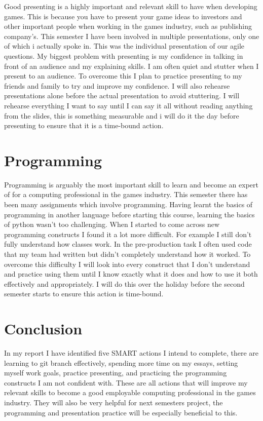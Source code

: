 \documentclass{scrartcl}
\begin{document}
Good presenting is a highly important and relevant skill to have when developing games. This is because you have to present your game ideas to investors and other important people when working in the games industry, such as publishing company's. This semester I have been involved in multiple presentations, only one of which i actually spoke in. This was the individual presentation of our agile questions. My biggest problem with presenting is my confidence in talking in front of an audience and my explaining skills. I am often quiet and stutter when I present to an audience. To overcome this I plan to practice presenting to my friends and family to try and improve my confidence. I will also rehearse presentations alone before the actual presentation to avoid stuttering. I will rehearse everything I want to say until I can say it all without reading anything from the slides, this is something measurable and i will do it the day before presenting to ensure that it is a time-bound action.      

\section{Programming}

Programming is arguably the most important skill to learn and become an expert of for a computing professional in the games industry. This semester there has been many assignments which involve programming. Having learnt the basics of programming in another language before starting this course, learning the basics of python wasn't too challenging. When I started to come across new programming constructs I found it a lot more difficult. For example I still don't fully understand how classes work. In the pre-production task I often used code that my team had written but didn't completely understand how it worked. To overcome this difficulty I will look into every construct that I don't understand and practice using them until I know exactly what it does and how to use it both effectively and appropriately. I will do this over the holiday before the second semester starts to ensure this action is time-bound.    

\section{Conclusion}

In my report I have identified five SMART actions I intend to complete, there are learning to git branch effectively, spending more time on my essays, setting myself work goals, practice presenting, and practicing the programming constructs I am not confident with. These are all actions that will improve my relevant skills to become a good employable computing professional in the games industry. They will also be very helpful for next semesters project, the programming and presentation practice will be especially beneficial to this.   




\end{document}
